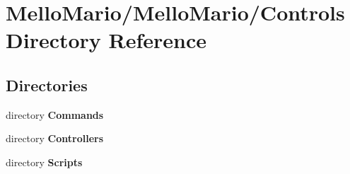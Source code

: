\section{Mello\+Mario/\+Mello\+Mario/\+Controls Directory Reference}
\label{dir_5d2a0d3b160cac35fb8ce555747d11d4}
\subsection*{Directories}
\begin{DoxyCompactItemize}
\item 
directory \textbf{ Commands}
\item 
directory \textbf{ Controllers}
\item 
directory \textbf{ Scripts}
\end{DoxyCompactItemize}
